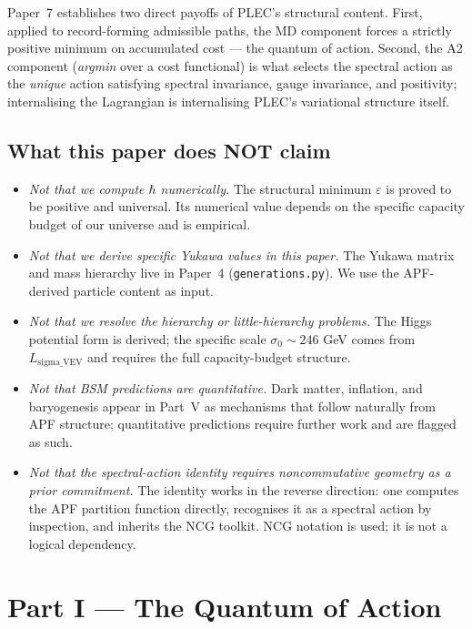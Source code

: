 \documentclass[11pt]{article}
\theoremstyle{definition}
\begin{document}
Paper~7 establishes two direct payoffs of PLEC's structural content.  First, applied to record-forming admissible paths, the MD component forces a strictly positive minimum on accumulated cost --- the quantum of action.  Second, the A2 component (\emph{argmin} over a cost functional) is what selects the spectral action as the \emph{unique} action satisfying spectral invariance, gauge invariance, and positivity; internalising the Lagrangian is internalising PLEC's variational structure itself.

\subsection{What this paper does NOT claim}
\begin{itemize}
\item \emph{Not that we compute $\hbar$ numerically.}  The structural minimum $\varepsilon$ is proved to be positive and universal.  Its numerical value depends on the specific capacity budget of our universe and is empirical.
\item \emph{Not that we derive specific Yukawa values in this paper.}  The Yukawa matrix and mass hierarchy live in Paper~4 (\texttt{generations.py}).  We use the APF-derived particle content as input.
\item \emph{Not that we resolve the hierarchy or little-hierarchy problems.}  The Higgs potential form is derived; the specific scale $\sigma_0 \sim 246$ GeV comes from $L_{\mathrm{sigma\_VEV}}$ and requires the full capacity-budget structure.
\item \emph{Not that BSM predictions are quantitative.}  Dark matter, inflation, and baryogenesis appear in Part~V as mechanisms that follow naturally from APF structure; quantitative predictions require further work and are flagged as such.
\item \emph{Not that the spectral-action identity requires noncommutative geometry as a prior commitment.}  The identity works in the reverse direction: one computes the APF partition function directly, recognises it as a spectral action by inspection, and inherits the NCG toolkit.  NCG notation is used; it is not a logical dependency.
\end{itemize}

\section*{Part I — The Quantum of Action}
\end{document}

